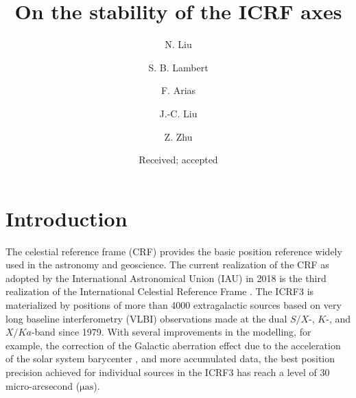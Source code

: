 \documentclass{aa}
\begin{document}
  \title{On the stability of the ICRF axes}
  \author{N. Liu
     \and
          S. B. Lambert %
          \and
          F. Arias
          \and
          J.-C. Liu
          \and
          Z. Zhu
          }


  \date{Received; accepted}


  \abstract
   {
   }
   {
   }
   {
   }
   {}


\maketitle


\section{Introduction}

    The celestial reference frame (CRF) provides the basic position reference widely used in the astronomy and geoscience.
    The current realization of the CRF as adopted by the International Astronomical Union (IAU) in 2018 is the third realization of the International Celestial Reference Frame \cite[ICRF3;][]{2020A&A...644A.159C}.
    The ICRF3 is materialized by positions of more than 4000 extragalactic sources based on very long baseline interferometry (VLBI) observations made at the dual $S/X$-, $K$-, and $X/Ka$-band since 1979.
    With several improvements in the modelling, for example, the correction of the Galactic aberration effect due to the acceleration of the solar system barycenter \citep{2019A&A...630A..93M}, and more accumulated data, the best position precision achieved for individual sources in the ICRF3 has reach a level of 30 micro-arcsecond ($\mathrm{\mu as}$).
    
\end{document}
